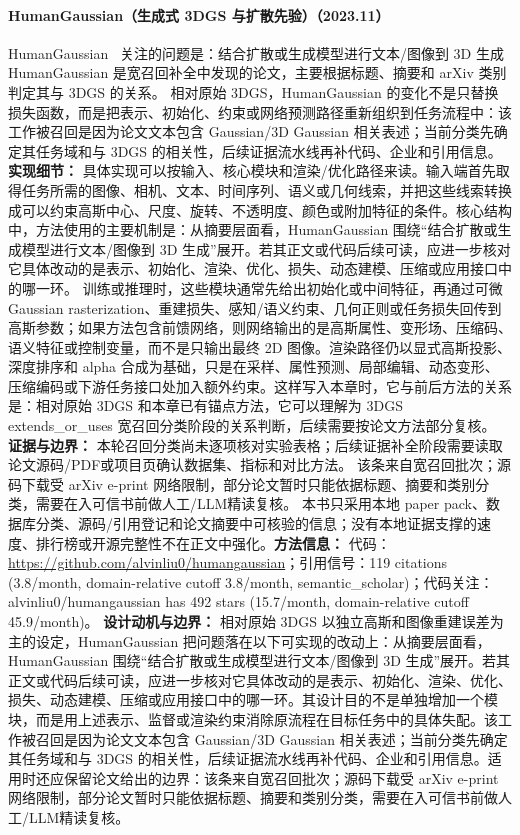 \paragraph{HumanGaussian（生成式 3DGS 与扩散先验）（2023.11）}
HumanGaussian~\cite{2311_17061} 关注的问题是：结合扩散或生成模型进行文本/图像到 3D 生成 HumanGaussian 是宽召回补全中发现的论文，主要根据标题、摘要和 arXiv 类别判定其与 3DGS 的关系。
相对原始 3DGS，HumanGaussian 的变化不是只替换损失函数，而是把表示、初始化、约束或网络预测路径重新组织到任务流程中：该工作被召回是因为论文文本包含 Gaussian/3D Gaussian 相关表述；当前分类先确定其任务域和与 3DGS 的相关性，后续证据流水线再补代码、企业和引用信息。
\textbf{实现细节：} 具体实现可以按输入、核心模块和渲染/优化路径来读。输入端首先取得任务所需的图像、相机、文本、时间序列、语义或几何线索，并把这些线索转换成可以约束高斯中心、尺度、旋转、不透明度、颜色或附加特征的条件。核心结构中，方法使用的主要机制是：从摘要层面看，HumanGaussian 围绕“结合扩散或生成模型进行文本/图像到 3D 生成”展开。若其正文或代码后续可读，应进一步核对它具体改动的是表示、初始化、渲染、优化、损失、动态建模、压缩或应用接口中的哪一环。 训练或推理时，这些模块通常先给出初始化或中间特征，再通过可微 Gaussian rasterization、重建损失、感知/语义约束、几何正则或任务损失回传到高斯参数；如果方法包含前馈网络，则网络输出的是高斯属性、变形场、压缩码、语义特征或控制变量，而不是只输出最终 2D 图像。渲染路径仍以显式高斯投影、深度排序和 alpha 合成为基础，只是在采样、属性预测、局部编辑、动态变形、压缩编码或下游任务接口处加入额外约束。这样写入本章时，它与前后方法的关系是：相对原始 3DGS 和本章已有锚点方法，它可以理解为 3DGS extends\_or\_uses 宽召回分类阶段的关系判断，后续需要按论文方法部分复核。
\textbf{证据与边界：} 本轮召回分类尚未逐项核对实验表格；后续证据补全阶段需要读取论文源码/PDF或项目页确认数据集、指标和对比方法。 该条来自宽召回批次；源码下载受 arXiv e-print 网络限制，部分论文暂时只能依据标题、摘要和类别分类，需要在入可信书前做人工/LLM精读复核。 本书只采用本地 paper pack、数据库分类、源码/引用登记和论文摘要中可核验的信息；没有本地证据支撑的速度、排行榜或开源完整性不在正文中强化。\textbf{方法信息：} 代码：\url{https://github.com/alvinliu0/humangaussian}；引用信号：119 citations (3.8/month, domain-relative cutoff 3.8/month, semantic\_scholar)；代码关注：alvinliu0/humangaussian has 492 stars (15.7/month, domain-relative cutoff 45.9/month)。
\textbf{设计动机与边界：} 相对原始 3DGS 以独立高斯和图像重建误差为主的设定，HumanGaussian 把问题落在以下可实现的改动上：从摘要层面看，HumanGaussian 围绕“结合扩散或生成模型进行文本/图像到 3D 生成”展开。若其正文或代码后续可读，应进一步核对它具体改动的是表示、初始化、渲染、优化、损失、动态建模、压缩或应用接口中的哪一环。其设计目的不是单独增加一个模块，而是用上述表示、监督或渲染约束消除原流程在目标任务中的具体失配。该工作被召回是因为论文文本包含 Gaussian/3D Gaussian 相关表述；当前分类先确定其任务域和与 3DGS 的相关性，后续证据流水线再补代码、企业和引用信息。适用时还应保留论文给出的边界：该条来自宽召回批次；源码下载受 arXiv e-print 网络限制，部分论文暂时只能依据标题、摘要和类别分类，需要在入可信书前做人工/LLM精读复核。

